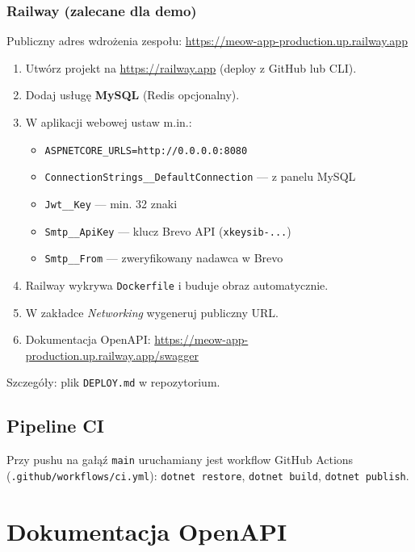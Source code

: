 \documentclass[12pt,a4paper]{article}
\begin{document}
\subsubsection{Railway (zalecane dla demo)}

Publiczny adres wdrożenia zespołu:
\url{https://meow-app-production.up.railway.app}

\begin{enumerate}
    \item Utwórz projekt na \url{https://railway.app} (deploy z GitHub lub CLI).
    \item Dodaj usługę \textbf{MySQL} (Redis opcjonalny).
    \item W aplikacji webowej ustaw m.in.:
    \begin{itemize}
        \item \texttt{ASPNETCORE\_URLS=http://0.0.0.0:8080}
        \item \texttt{ConnectionStrings\_\_DefaultConnection} --- z panelu MySQL
        \item \texttt{Jwt\_\_Key} --- min. 32 znaki
        \item \texttt{Smtp\_\_ApiKey} --- klucz Brevo API (\texttt{xkeysib-...})
        \item \texttt{Smtp\_\_From} --- zweryfikowany nadawca w Brevo
    \end{itemize}
    \item Railway wykrywa \texttt{Dockerfile} i buduje obraz automatycznie.
    \item W zakładce \emph{Networking} wygeneruj publiczny URL.
    \item Dokumentacja OpenAPI:
          \url{https://meow-app-production.up.railway.app/swagger}
\end{enumerate}

Szczegóły: plik \texttt{DEPLOY.md} w repozytorium.

\subsection{Pipeline CI}

Przy pushu na gałąź \texttt{main} uruchamiany jest workflow GitHub Actions
(\texttt{.github/workflows/ci.yml}): \texttt{dotnet restore}, \texttt{dotnet build},
\texttt{dotnet publish}.

\section{Dokumentacja OpenAPI}
\end{document}
